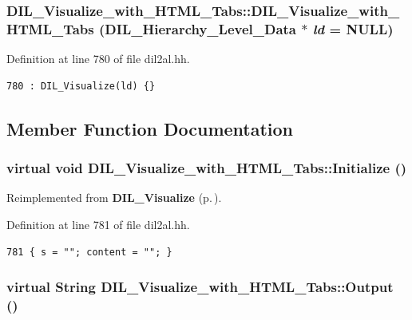 \subsubsection{\setlength{\rightskip}{0pt plus 5cm}DIL\_\-Visualize\_\-with\_\-HTML\_\-Tabs::DIL\_\-Visualize\_\-with\_\-HTML\_\-Tabs ({\bf DIL\_\-Hierarchy\_\-Level\_\-Data} $\ast$ {\em ld} = NULL)\hspace{0.3cm}{\tt  [inline]}}\label{classDIL__Visualize__with__HTML__Tabs_a0}




Definition at line 780 of file dil2al.hh.



\footnotesize\begin{verbatim}780 : DIL_Visualize(ld) {}
\end{verbatim}\normalsize 


\subsection{Member Function Documentation}
\subsubsection{\setlength{\rightskip}{0pt plus 5cm}virtual void DIL\_\-Visualize\_\-with\_\-HTML\_\-Tabs::Initialize ()\hspace{0.3cm}{\tt  [inline, virtual]}}\label{classDIL__Visualize__with__HTML__Tabs_a1}




Reimplemented from {\bf DIL\_\-Visualize} {\rm (p.\,\pageref{classDIL__Visualize_a1})}.

Definition at line 781 of file dil2al.hh.



\footnotesize\begin{verbatim}781 { s = ""; content = ""; }
\end{verbatim}\normalsize 
{}
\subsubsection{\setlength{\rightskip}{0pt plus 5cm}virtual {\bf String} DIL\_\-Visualize\_\-with\_\-HTML\_\-Tabs::Output ()\hspace{0.3cm}{\tt  [inline, virtual]}}\label{classDIL__Visualize__with__HTML__Tabs_a4}




